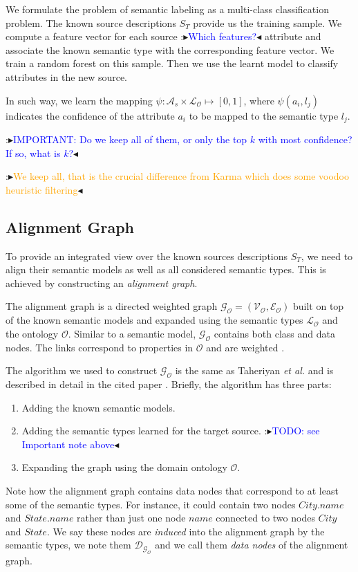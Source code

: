 \documentclass[letterpaper]{article} %
\newcommand{\authornote}[3]{
  {\fbox{\sc 
  #1}:$\blacktriangleright$\textcolor{#2}{\small{#3}}$\blacktriangleleft$}%
}
\newcommand{\ddg}[1]{\authornote{DDG}{blue}{#1}}
\newcommand{\npr}[1]{\authornote{NPR}{orange}{#1}}
\newcommand{\etal}{\textit{et al.}}
\begin{document}
We formulate the problem of semantic labeling as a multi-class classification
problem.
The known source descriptions $S_T$ provide us the training sample.
We compute a feature vector for each source \ddg{Which features?} attribute and associate the known semantic type with the corresponding feature vector. We train a random forest on this sample. 
Then we use the learnt model to classify attributes in the new
source.

In such way, we learn the mapping $\psi : \mathcal{A}_s \times \mathcal{L_O} 
\mapsto [0, 1]$,
where $\psi(a_i,l_j)$ indicates the confidence of the attribute $a_i$ to be 
mapped to the semantic type $l_j$.

\ddg{IMPORTANT: Do we keep all of them, or only the top $k$ with most 
confidence? If so, 
what is $k$?}
\npr{We keep all, that is the crucial difference from Karma which does some voodoo heuristic filtering}


\subsection{Alignment Graph}

To provide an integrated view over the known sources descriptions $S_T$, we 
need to align their semantic models as well as all considered semantic 
types. This is achieved by constructing an \emph{alignment graph}. 

The alignment graph is a directed weighted graph $\mathcal{G_O} = 
(\mathcal{V_O},\mathcal{E_O})$ built on top 
of the known semantic models and expanded using the semantic types 
$\mathcal{L_O}$ and the ontology $\mathcal{O}$. Similar to a semantic 
model, $\mathcal{G_O}$ contains both class and data nodes. The links correspond 
to properties in  $\mathcal{O}$ and are weighted \cite{taheriyan2016learning}.

The algorithm we used to construct $\mathcal{G_O}$ is the same as Taheriyan 
\etal{} and is described in detail in the cited paper 
\cite{taheriyan2016learning}.
Briefly, the algorithm has three parts:
\begin{enumerate}
\item Adding the known semantic models.
\item Adding the semantic types learned for the target source. \ddg{TODO: see 
Important note above}
\item Expanding the graph using the domain ontology $\mathcal{O}$.
\end{enumerate}

Note how the alignment graph contains data nodes that correspond to at least 
some of the semantic types. 
For instance, it could contain two nodes $City.name$ and $State.name$ rather than just one node $name$ connected to two 
nodes $City$ and $State$. We say these nodes are \emph{induced} into the 
alignment graph by the semantic types, we note them $\mathcal{D_{G_O}}$ and we 
call them \emph{data nodes} of the alignment graph.
\end{document}
